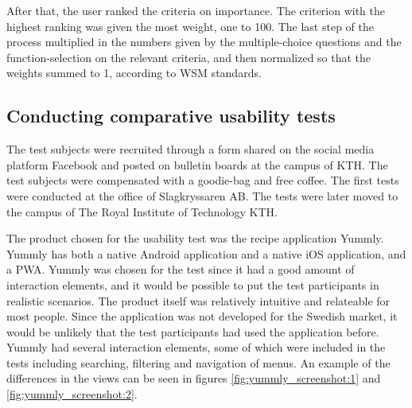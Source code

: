 After that, the user ranked the criteria on importance. The criterion with the highest ranking was given the most weight, one to 100.
The last step of the process multiplied in the numbers given by the multiple-choice questions and the function-selection on the relevant criteria, and then normalized so that the weights summed to 1, according to WSM standards.  

\subsection{Conducting comparative usability tests}
The test subjects were recruited through a form shared on the social media platform Facebook and posted on bulletin boards at the campus of KTH. The test subjects were compensated with a goodie-bag and free coffee.
The first tests were conducted at the office of Slagkryssaren AB. The tests were later moved to the campus of The Royal Institute of Technology KTH.

The product chosen for the usability test was the recipe application Yummly. Yummly has both a native Android application and a native iOS application, and a PWA. Yummly was chosen for the test since it had a good amount of interaction elements, and it would be possible to put the test participants in realistic scenarios. The product itself was relatively intuitive and relateable for most people. Since the application was not developed for the Swedish market, it would be unlikely that the test participants had used the application before. Yummly had several interaction elements, some of which were included in the tests including searching, filtering and navigation of menus. An example of the differences in the views can be seen in figures \ref{fig:yummly_screenshot:1} and \ref{fig:yummly_screenshot:2}.

